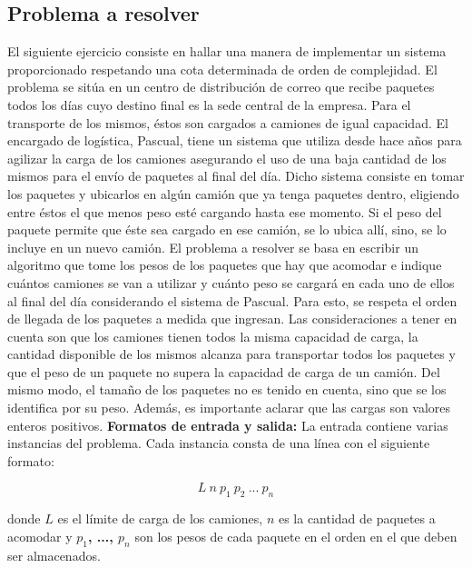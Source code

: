 \subsection{Problema a resolver}
El siguiente ejercicio consiste en hallar una manera de implementar un sistema proporcionado respetando una cota determinada de orden de complejidad. El problema se sitúa en un centro de distribución de correo que recibe paquetes todos los días cuyo destino final es la sede central de la empresa. Para el transporte de los mismos, éstos son cargados a camiones de igual capacidad. El encargado de logística, Pascual, tiene un sistema que utiliza desde hace años para agilizar la carga de los camiones asegurando el uso de una baja cantidad de los mismos para el envío de paquetes al final del día. Dicho sistema consiste en tomar los paquetes y ubicarlos en algún camión que ya tenga paquetes dentro, eligiendo entre éstos el que menos peso esté cargando hasta ese momento. Si el peso del paquete permite que éste sea cargado en ese camión, se lo ubica allí, sino, se lo incluye en un nuevo camión.\newline
El problema a resolver se basa en escribir un algoritmo que tome los pesos de los paquetes que hay que acomodar e indique cuántos camiones se van a utilizar y cuánto peso se cargará en cada uno de ellos al final del día considerando el sistema de Pascual. Para esto, se respeta el orden de llegada de los paquetes a medida que ingresan. \newline
Las consideraciones a tener en cuenta son que los camiones tienen todos la misma capacidad de carga, la cantidad disponible de los mismos alcanza para transportar todos los paquetes y que el peso de un paquete no supera la capacidad de carga de un camión. Del mismo modo, el tamaño de los paquetes no es tenido en cuenta, sino que se los identifica por su peso. Además, es importante aclarar que las cargas son valores enteros positivos.\newline
\newline
\textbf {Formatos de entrada y salida:}\newline
\newline
La entrada contiene varias instancias del problema. Cada instancia consta de una línea con el siguiente formato:

$$L\ n\ p_{1}\ p_{2}\ ...\ p_{n}$$


donde \textbf{$L$} es el límite de carga de los camiones, \textbf{$n$} es la cantidad de paquetes a acomodar y \textbf{$p_{1}$, ..., $p_{n}$} son los pesos de cada paquete en el orden en el que deben ser almacenados.\newline

